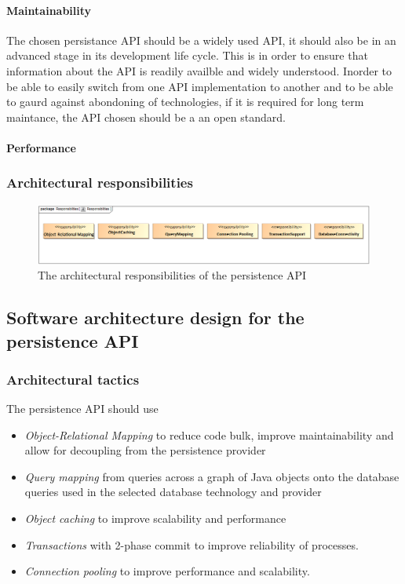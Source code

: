 \documentclass[a4paper,12pt]{report}
\begin{document}
\paragraph {Maintainability}
\hfill \break
The chosen persistance API should be a widely used API, it should also be in an advanced stage in its development life cycle. This is in order to ensure that information about the API is readily availble and widely understood. Inorder to be able to easily switch from one API implementation to another and to be able to gaurd against abondoning of technologies, if it is required for long term maintance, the API chosen should be a an open standard.

\paragraph {Performance}

\subsubsection {Architectural responsibilities}
	\begin{figure}[htb]
		\centering
		\includegraphics  [scale=0.5]{../Diagrams/PersistanceResponsibiltiesZ.png}
		\caption{The architectural responsibilities of the persistence API}
	\end{figure}

\subsection {Software architecture design for the persistence API}
\subsubsection {Architectural tactics}
The persistence API should use
	\begin {itemize}
		\item \textit{Object-Relational Mapping} to reduce code bulk, improve maintainability and allow for decoupling from the 		persistence provider
		
		\item \textit{Query mapping} from queries across a graph of Java objects onto the database queries used in the selected database technology and provider

		\item \textit{Object caching} to improve scalability and performance

		\item \textit{Transactions} with 2-phase commit to improve reliability of processes.

		\item \textit{Connection pooling} to improve performance and scalability.
	\end {itemize}
\end{document}

